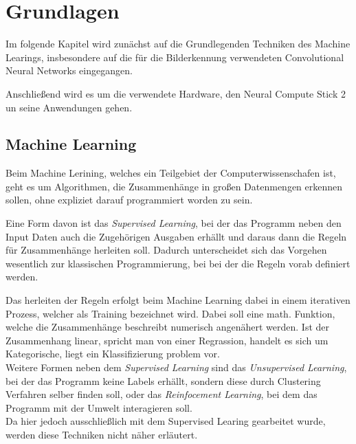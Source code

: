 \chapter{Grundlagen}\label{kap:grundlagen}


Im folgende Kapitel wird zunächst auf die Grundlegenden Techniken
 des Machine Learings, insbesondere auf die für die Bilderkennung 
verwendeten Convolutional Neural Networks eingegangen.

Anschließend wird es um die verwendete Hardware, den Neural 
Compute Stick 2 un seine Anwendungen gehen.



\section{Machine Learning}\label{sec:ml}

Beim Machine Lerining, welches ein Teilgebiet der Computerwissenschafen
ist, geht es um Algorithmen, die Zusammenhänge in großen Datenmengen 
erkennen sollen, ohne expliziet darauf programmiert worden zu sein.

Eine Form davon ist das \textit{Supervised Learning}, bei der das Programm 
neben den Input Daten auch die Zugehörigen Ausgaben erhällt und daraus 
dann die Regeln für Zusammenhänge herleiten soll.
Dadurch unterscheidet sich das Vorgehen wesentlich zur klassischen Programmierung,
bei bei der die Regeln vorab definiert werden.

\vspace{0.5cm}
\begin{figure}[htb]
    \centering
    \def\svgwidth{0.8\columnwidth}
    \footnotesize
    
\end{figure}
\vspace{0.5cm}

Das herleiten der Regeln erfolgt beim Machine Learning dabei in einem 
iterativen Prozess, welcher als Training bezeichnet wird.
Dabei soll eine math. Funktion, welche die Zusammenhänge beschreibt 
numerisch angenähert werden. Ist der Zusammenhang linear, spricht man 
von einer Regrassion, handelt es sich um Kategorische, liegt 
ein Klassifizierung problem vor.
\\
Weitere Formen neben dem \textit{Supervised Learning} sind das 
\textit{Unsupervised Learning}, bei der das Programm keine Labels 
erhällt, sondern diese durch Clustering Verfahren selber finden 
soll, oder das \textit{Reinfocement Learning}, bei dem das Programm 
mit der Umwelt interagieren soll.
\\
Da hier jedoch ausschließlich mit dem Supervised Learing gearbeitet
wurde, werden diese Techniken nicht näher erläutert.



